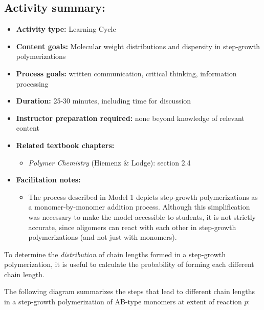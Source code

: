 \begin{activity}
\begin{instructornotes}
	\subsection*{Activity summary:}
	\begin{itemize}
		\item \textbf{Activity type:} Learning Cycle
		\item \textbf{Content goals:} Molecular weight distributions and dispersity in step-growth polymerizations
		\item \textbf{Process goals:} %
			written communication, critical thinking, information processing
		\item \textbf{Duration:} 25-30 minutes, including time for discussion
		\item \textbf{Instructor preparation required:} none beyond knowledge of relevant content
		\item \textbf{Related textbook chapters:}
			\begin{itemize}
				\item \emph{Polymer Chemistry} (Hiemenz \& Lodge): section 2.4
			\end{itemize}
		\item \textbf{Facilitation notes:}
			\begin{itemize}
				\item The process described in Model 1 depicts step-growth polymerizations as a monomer-by-monomer addition process.  Although this simplification was necessary to make the model accessible to students, it is not strictly accurate, since oligomers can react with each other in step-growth polymerizations (and not just with monomers).
			\end{itemize}
	\end{itemize}

\end{instructornotes}


\begin{model}

To determine the \emph{distribution} of chain lengths formed in a step-growth polymerization, it is useful to calculate the probability of forming each different chain length.

The following diagram summarizes the steps that lead to different chain lengths in a step-growth polymerization of AB-type monomers at extent of reaction $p$:


\end{model}
\end{activity}
